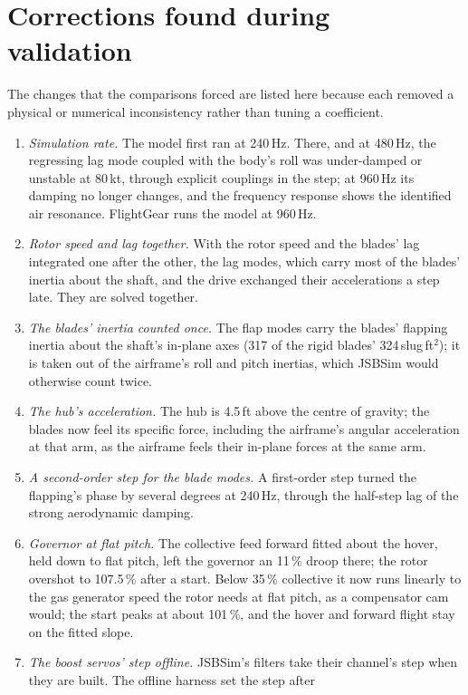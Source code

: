 \documentclass[10pt,a4paper,twocolumn]{article}
\begin{document}
\section{Corrections found during validation}\label{sec:review}
The changes that the comparisons forced are listed here because each removed a physical or numerical inconsistency rather than tuning a coefficient.
\begin{enumerate}
\item \emph{Simulation rate.} The model first ran at 240\,Hz. There, and at 480\,Hz, the regressing lag mode coupled with the body's roll was under-damped or
unstable at 80\,kt, through explicit couplings in the step; at 960\,Hz its damping no longer changes, and the frequency response shows the identified air
resonance. FlightGear runs the model at 960\,Hz.
\item \emph{Rotor speed and lag together.} With the rotor speed and the blades' lag integrated one after the other, the lag modes, which carry most of the
blades' inertia about the shaft, and the drive exchanged their accelerations a step late. They are solved together.
\item \emph{The blades' inertia counted once.} The flap modes carry the blades' flapping inertia about the shaft's in-plane axes (317 of the rigid blades'
324\,slug\,ft$^2$); it is taken out of the airframe's roll and pitch inertias, which JSBSim would otherwise count twice.
\item \emph{The hub's acceleration.} The hub is 4.5\,ft above the centre of gravity; the blades now feel its specific force, including the airframe's
angular acceleration at that arm, as the airframe feels their in-plane forces at the same arm.
\item \emph{A second-order step for the blade modes.} A first-order step turned the flapping's phase by several degrees at 240\,Hz, through the half-step lag of
the strong aerodynamic damping.
\item \emph{Governor at flat pitch.} The collective feed forward fitted about the hover, held down to flat pitch, left the governor an 11\,\% droop there; the
rotor overshot to 107.5\,\% after a start. Below 35\,\% collective it now runs linearly to the gas generator speed the rotor needs at flat pitch, as a
compensator cam would; the start peaks at about 101\,\%, and the hover and forward flight stay on the fitted slope.
\item \emph{The boost servos' step offline.} JSBSim's filters take their channel's step when they are built. The offline harness set the step after

\end{enumerate}
\end{document}
